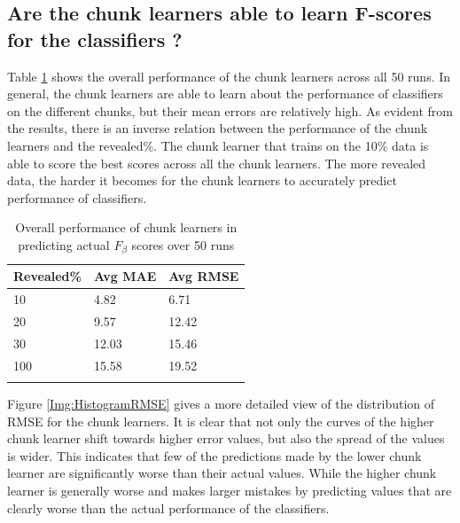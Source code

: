 \subsection{Are the chunk learners able to learn F-scores for the classifiers ?}
\label{SubsectionFScoreResults}
Table \ref{TableOverallErrors} shows the overall performance of the chunk learners across all 50 runs.
In general, the chunk learners are able to learn about the performance of classifiers on the different chunks, but their mean errors are relatively high.
As evident from the results, there is an inverse relation between the performance of the chunk learners and the revealed\%.
The chunk learner that trains on the 10\% data is able to score the best scores across all the chunk learners.
The more revealed data, the harder it becomes for the chunk learners to accurately predict performance of classifiers.

\begin{table}[hp!]
    \setlength\extrarowheight{2pt} %
    \begin{tabularx}{\textwidth}{|X|X|X|}
    \hline
    \textbf{Revealed\%} & \textbf{Avg MAE} & \textbf{Avg RMSE} \\ \hline
        10 & 4.82 & 6.71 \\ \hline
        20 & 9.57 & 12.42 \\ \hline
        30 & 12.03 & 15.46 \\ \hline
        100 & 15.58 & 19.52 \\ \hline
      \caption{Overall performance of chunk learners in predicting actual $F_{\beta}$ scores over 50 runs}
      \label{TableOverallErrors}
      \end{tabularx}
  \end{table}

Figure \ref{Img:HistogramRMSE} gives a more detailed view of the distribution of RMSE for the chunk learners.
It is clear that not only the curves of the higher chunk learner shift towards higher error values, but also the spread of the values is wider.
This indicates that few of the predictions made by the lower chunk learner are significantly worse than their actual values.
While the higher chunk learner is generally worse and makes larger mistakes by predicting values that are clearly worse than the actual performance of the classifiers.

